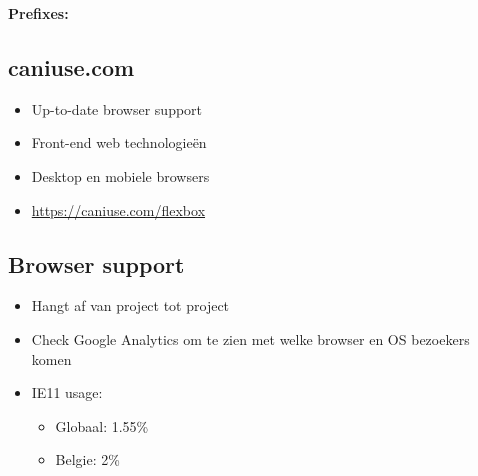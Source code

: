 \documentclass{article}
\newcommand{\bold}[1]{\textbf{#1}}
\begin{document}
\bold{Prefixes:}

\begin{table}[H]
\end{table}

\subsection{caniuse.com}
\begin{itemize}
    \item Up-to-date browser support
    \item Front-end web technologieën
    \item Desktop en mobiele browsers 
    \item \url{https://caniuse.com/flexbox}
\end{itemize}


\subsection{Browser support}

\begin{itemize}
    \item Hangt af van project tot project
    \item Check Google Analytics om te zien met welke browser en OS bezoekers komen
    \item IE11 usage:
    \begin{itemize}
        \item Globaal: 1.55\%
        \item Belgie: 2\%
    \end{itemize}
\end{itemize}
\end{document}
